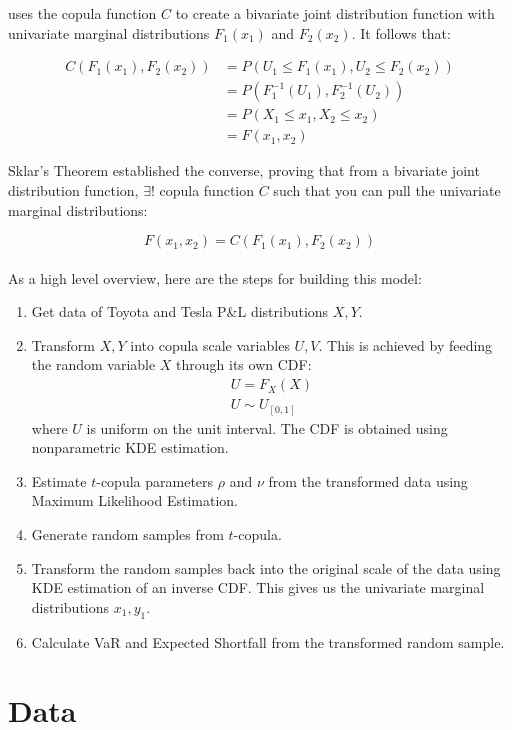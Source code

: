 \documentclass[titlepage]{article}
\begin{document}
uses the copula function $C$ to create a bivariate joint distribution function with univariate marginal distributions $F_1(x_1)$ and $F_2(x_2)$. It follows that:

\begin{align*}
C(F_1(x_1),F_2(x_2)) &= P(U_1 \leq F_1(x_1), U_2 \leq F_2(x_2)) \\
&= P(F_1^{-1}(U_1), F_2^{-1}(U_2)) \\
&= P(X_1 \leq x_1, X_2 \leq x_2) \\
&= F(x_1,x_2)
\end{align*}

Sklar's Theorem established the converse, proving that from a bivariate joint distribution function, $\exists !$ copula function $C$ such that you can pull the univariate marginal distributions:

\begin{equation}
F(x_1,x_2) = C(F_1(x_1), F_2(x_2))
\end{equation}
\\
As a high level overview, here are the steps for building this model:
\begin{enumerate}
	\item Get data of Toyota and Tesla P\&L distributions $X, Y$.
	\item Transform $X, Y$ into copula scale variables $U,V$. This is achieved by feeding the random variable $X$ through its own CDF: 
	\begin{align*}
	U = F_X (X) \\
	U \sim U_{[0,1]}
	\end{align*}
	where $U$ is uniform on the unit interval. The CDF is obtained using nonparametric KDE estimation.
	\item Estimate $t$-copula parameters $\rho$ and $\nu$ from the transformed data using Maximum Likelihood Estimation.
	\item Generate random samples from $t$-copula.
	\item Transform the random samples back into the original scale of the data using KDE estimation of an inverse CDF. This gives us the univariate marginal distributions $x_1, y_1$.
	\item Calculate VaR and Expected Shortfall from the transformed random sample.
\end{enumerate}

\section{Data}
\end{document}
